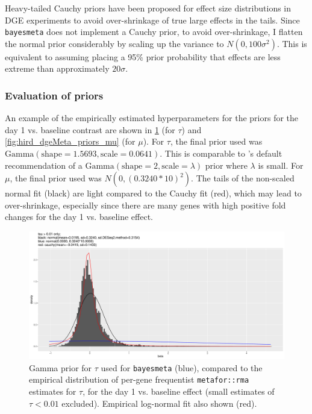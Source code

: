 Heavy-tailed Cauchy priors have been proposed for effect size distributions in \gls{DGE} experiments to avoid over-shrinkage of true large effects in the tails\autocite{zhu2019HeavytailedPriorDistributions}.
Since \texttt{bayesmeta} does not implement a Cauchy prior, to avoid over-shrinkage, I flatten the normal prior considerably by scaling up the variance to $N(0, 100\sigma^2)$.
This is equivalent to assuming placing a 95\% prior probability that effects are less extreme than approximately $20\sigma$.

\subsubsection{Evaluation of priors}

An example of the empirically estimated hyperparameters for the priors for the day 1 vs. baseline contrast are shown in \cref{fig:hird_dgeMeta_priors_tau} (for $\tau$) and \cref{fig:hird_dgeMeta_priors_mu} (for $\mu$).
For $\tau$, the final prior used was $\text{Gamma}(\text{shape}=1.5693, \text{scale}=0.0641)$.
This is comparable to \autocite{chung2013NondegeneratePenalizedLikelihood}'s default recommendation of a $\text{Gamma}(\text{shape}=2, \text{scale}=\lambda)$ prior where $\lambda$ is small.
For $\mu$, the final prior used was $N(0, (0.3240*10)^2)$.
The tails of the non-scaled normal fit (black) are light compared to the Cauchy fit (red), which may lead to over-shrinkage, especially since there are many genes with high positive fold changes for the day 1 vs. baseline effect.

\begin{figure}
    \includegraphics[width=1.0\textwidth,page=2]{mainmatter/figures/chapter_02/meta.bayesmeta.priors.coefName_d1.vs.d0.pdf}
    \caption{Gamma prior for $\tau$ used for \texttt{bayesmeta} (blue), compared to the empirical distribution of per-gene frequentist \texttt{metafor::rma} estimates for $\tau$, for the day 1 vs. baseline effect (small estimates of $\tau < 0.01$ excluded). Empirical log-normal fit also shown (red).}
    \label{fig:hird_dgeMeta_priors_tau}
\end{figure}

